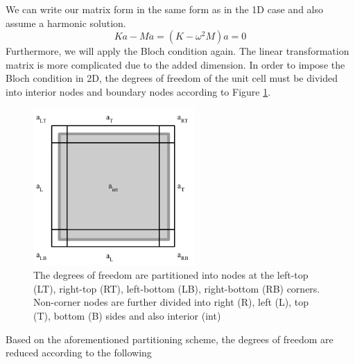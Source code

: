 \documentclass{article}
\begin{document}
We can write our matrix form in the same form as in the 1D case and also assume 
a harmonic solution.
\begin{equation} \label{twodfem}
Ka - M\ddot{a} = \left(K - \omega^2 M\right)a = 0
\end{equation}
Furthermore, we will apply the Bloch condition again. The linear transformation 
matrix is more complicated due to the added dimension. In order to impose the 
Bloch condition in 2D, the degrees of freedom of the unit cell must be divided 
into interior nodes and boundary nodes according to Figure 
\ref{fig:twodunitcell}.
\begin{figure}[!htbp]
	\centering
	\includegraphics[width=0.55\textwidth]{twodunitcell.pdf}
	\caption{The degrees of freedom are partitioned into nodes at the left-top 
	(LT), right-top (RT), left-bottom (LB), right-bottom (RB) corners. 
	Non-corner nodes are further divided into right (R), left (L), top (T), 
	bottom (B) sides and also interior (int)}
	\label{fig:twodunitcell}
\end{figure}
Based on the aforementioned partitioning scheme, the degrees of freedom are 
reduced according to the following
\end{document}
